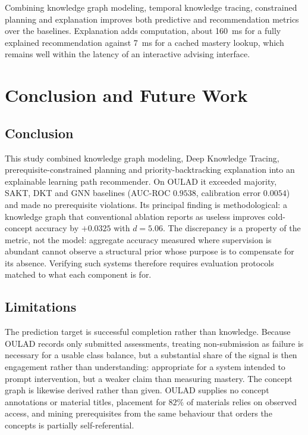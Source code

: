 \documentclass[conference]{IEEEtran}
\begin{document}
Combining knowledge graph modeling, temporal knowledge tracing, constrained planning and
explanation improves both predictive and recommendation metrics over the baselines.
Explanation adds computation, about 160~ms for a fully explained recommendation against
7~ms for a cached mastery lookup, which remains well within the latency of an interactive
advising interface.

\section{Conclusion and Future Work}
\label{sec:conclusion}

\subsection{Conclusion}

This study combined knowledge graph modeling, Deep Knowledge Tracing, prerequisite-constrained
planning and priority-backtracking explanation into an explainable learning path
recommender. On OULAD it exceeded majority, SAKT, DKT and GNN baselines (AUC-ROC $0.9538$,
calibration error $0.0054$) and made no prerequisite violations. Its principal finding is
methodological: a knowledge graph that conventional ablation reports as useless improves
cold-concept accuracy by $+0.0325$ with $d = 5.06$. The discrepancy is a property of the
metric, not the model: aggregate accuracy measured where supervision is abundant cannot
observe a structural prior whose purpose is to compensate for its absence. Verifying such
systems therefore requires evaluation protocols matched to what each component is for.

\subsection{Limitations}

The prediction target is successful completion rather than knowledge. Because OULAD records
only submitted assessments, treating non-submission as failure is necessary for a usable
class balance, but a substantial share of the signal is then engagement rather than
understanding: appropriate for a system intended to prompt intervention, but a weaker claim
than measuring mastery. The concept graph is likewise derived rather than given. OULAD
supplies no concept annotations or material titles, placement for $82\%$ of materials
relies on observed access, and mining prerequisites from the same behaviour that orders
the concepts is partially self-referential.
\end{document}
